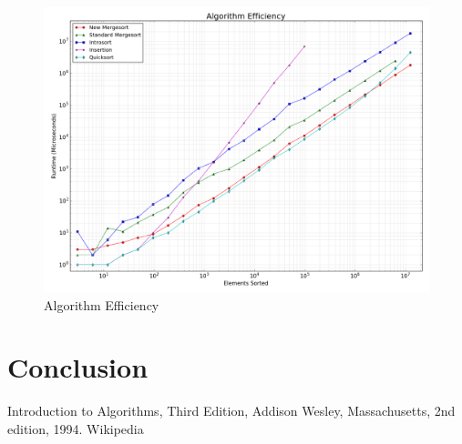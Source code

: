 \documentclass[12pt]{article}
\begin{document}
	\begin{figure}[H]
		\centering
		\includegraphics[width=6in]{figure_3.png}
		\caption{Algorithm Efficiency}
		\label{fig:algeff}
	\end{figure}
	
\section{Conclusion}

\pagebreak


\begin{thebibliography}{9}
	Introduction to Algorithms, Third Edition,
	Addison Wesley, Massachusetts,
	2nd edition,
	1994.
	Wikipedia
	
\end{thebibliography}
\end{document}
